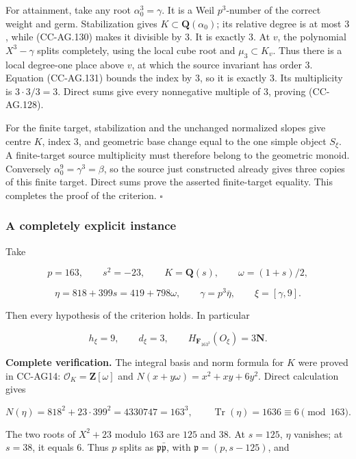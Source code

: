For attainment, take any root \(\alpha_0^3=\gamma\). It is a Weil
\(p^3\)-number of the correct weight and germ. Stabilization gives
\(K\subset\mathbf Q(\alpha_0)\); its relative degree is at most \(3\),
while (CC-AG.130) makes it divisible by \(3\). It is exactly \(3\). At
\(v\), the polynomial \(X^3-\gamma\) splits completely, using the local
cube root and \(\mu_3\subset K_v\). Thus there is a local degree-one
place above \(v\), at which the source invariant has order \(3\).
Equation (CC-AG.131) bounds the index by \(3\), so it is exactly \(3\).
Its multiplicity is \(3\cdot3/3=3\). Direct sums give every nonnegative
multiple of \(3\), proving (CC-AG.128).

For the finite target, stabilization and the unchanged normalized slopes
give centre \(K\), index \(3\), and geometric base change equal to the
one simple object \(S_\xi\). A finite-target source multiplicity must
therefore belong to the geometric monoid. Conversely
\(\alpha_0^9=\gamma^3=\beta\), so the source just constructed already
gives three copies of this finite target. Direct sums prove the asserted
finite-target equality. This completes the proof of the criterion.
\(\square\)

\subsubsection{A completely explicit
instance}\label{a-completely-explicit-instance}

Take

\[
 p=163,\qquad s^2=-23,\qquad K=\mathbf Q(s),\qquad
 \omega=(1+s)/2,
\]

\[
 \eta=818+399s=419+798\omega,
 \qquad \gamma=p^3\bar\eta,
 \qquad \xi=[\gamma,9].
 \tag{CC-AG.139}
\]

Then every hypothesis of the criterion holds. In particular

\[
 h_\xi=9,\qquad d_\xi=3,\qquad
 H_{\mathbf F_{163^3}}(O_\xi)=3\mathbf N.
 \tag{CC-AG.140}
\]

\textbf{Complete verification.} The integral basis and norm formula for
\(K\) were proved in CC-AG14: \(\mathcal O_K=\mathbf Z[\omega]\) and
\(N(x+y\omega)=x^2+xy+6y^2\). Direct calculation gives

\[
 N(\eta)=818^2+23\cdot399^2=4330747=163^3,
 \qquad \operatorname{Tr}(\eta)=1636\equiv6\pmod{163}.
 \tag{CC-AG.141}
\]

The two roots of \(X^2+23\) modulo \(163\) are \(125\) and \(38\). At
\(s=125\), \(\eta\) vanishes; at \(s=38\), it equals \(6\). Thus \(p\)
splits as \(\mathfrak p\bar{\mathfrak p}\), with
\(\mathfrak p=(p,s-125)\), and


